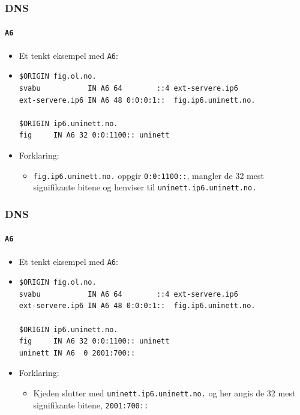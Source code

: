 \begin{frame}[fragile]
  \frametitle{DNS}
  \framesubtitle{\texttt{A6}}
  \begin{itemize}
  \item Et tenkt eksempel med \texttt{A6}:
  \item 
\begin{verbatim}
$ORIGIN fig.ol.no.
svabu           IN A6 64        ::4 ext-servere.ip6
ext-servere.ip6 IN A6 48 0:0:0:1::  fig.ip6.uninett.no.

$ORIGIN ip6.uninett.no.
fig     IN A6 32 0:0:1100:: uninett
\end{verbatim}
  \item Forklaring:
    \begin{itemize}
    \item \texttt{fig.ip6.uninett.no.} oppgir \texttt{0:0:1100::},
      mangler de 32 mest signifikante bitene og henviser til
      \texttt{uninett.ip6.uninett.no.}
    \end{itemize}
  \end{itemize}
\end{frame}

\begin{frame}[fragile]
  \frametitle{DNS}
  \framesubtitle{\texttt{A6}}
  \begin{itemize}
  \item Et tenkt eksempel med \texttt{A6}:
  \item 
\begin{verbatim}
$ORIGIN fig.ol.no.
svabu           IN A6 64        ::4 ext-servere.ip6
ext-servere.ip6 IN A6 48 0:0:0:1::  fig.ip6.uninett.no.

$ORIGIN ip6.uninett.no.
fig     IN A6 32 0:0:1100:: uninett
uninett IN A6  0 2001:700::
\end{verbatim}
  \item Forklaring:
    \begin{itemize}
    \item Kjeden slutter med \texttt{uninett.ip6.uninett.no.} og her
      angis de 32 mest signifikante bitene, \texttt{2001:700::}
    \end{itemize}
  \end{itemize}
\end{frame}

